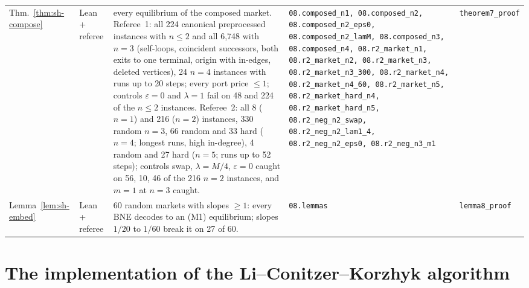 \begin{longtable}{@{}p{2.7cm}p{1.1cm}p{4.2cm}p{3.75cm}p{3.05cm}@{}}
Thm.~\ref{thm:sh-compose} & Lean + referee & every equilibrium of the composed market. Referee~1: all 224 canonical preprocessed instances with $n\le2$ and all 6{,}748 with $n=3$ (self-loops, coincident successors, both exits to one terminal, origin with in-edges, deleted vertices), 24 $n=4$ instances with runs up to 20 steps; every port price $\le1$; controls $\varepsilon=0$ and $\lambda=1$ fail on 48 and 224 of the $n\le2$ instances. Referee~2: all 8 ($n=1$) and 216 ($n=2$) instances, 330 random $n=3$, 66 random and 33 hard ($n=4$; longest runs, high in-degree), 4 random and 27 hard ($n=5$; runs up to 52 steps); controls swap, $\lambda=M/4$, $\varepsilon=0$ caught on 56, 10, 46 of the 216 $n=2$ instances, and $m=1$ at $n=3$ caught. & {\scriptsize\raggedright\texttt{08.composed\_n1,\allowbreak{} 08.composed\_n2,\allowbreak{} 08.composed\_n2\_eps0,\allowbreak{} 08.composed\_n2\_lamM,\allowbreak{} 08.composed\_n3,\allowbreak{} 08.composed\_n4,\allowbreak{} 08.r2\_market\_n1,\allowbreak{} 08.r2\_market\_n2,\allowbreak{} 08.r2\_market\_n3,\allowbreak{} 08.r2\_market\_n3\_300,\allowbreak{} 08.r2\_market\_n4,\allowbreak{} 08.r2\_market\_n4\_60,\allowbreak{} 08.r2\_market\_n5,\allowbreak{} 08.r2\_market\_hard\_n4,\allowbreak{} 08.r2\_market\_hard\_n5,\allowbreak{} 08.r2\_neg\_n2\_swap,\allowbreak{} 08.r2\_neg\_n2\_lam1\_4,\allowbreak{} 08.r2\_neg\_n2\_eps0,\allowbreak{} 08.r2\_neg\_n3\_m1}\par} & {\scriptsize\raggedright\texttt{theorem7\_proof}}\\
Lemma~\ref{lem:sh-embed} & Lean + referee & 60 random markets with slopes $\ge1$: every BNE decodes to an (M1) equilibrium; slopes $1/20$ to $1/60$ break it on 27 of 60. & {\scriptsize\raggedright\texttt{08.lemmas}\par} & {\scriptsize\raggedright\texttt{lemma8\_proof}}\\
\end{longtable}
\setlength{\tabcolsep}{6pt}
\small

\section{The implementation of the Li--Conitzer--Korzhyk algorithm}

